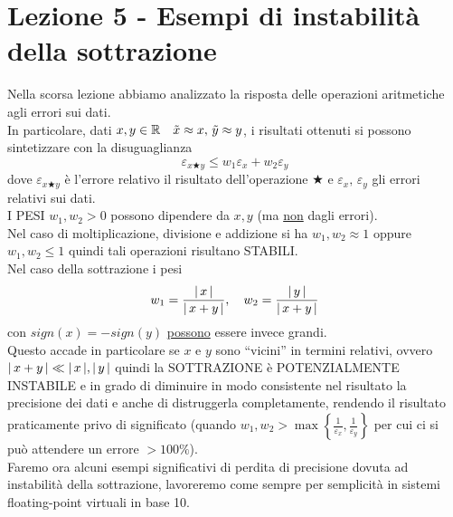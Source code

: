 \section{Lezione 5 - Esempi di instabilità della sottrazione}
Nella scorsa lezione abbiamo analizzato la risposta delle operazioni aritmetiche agli errori sui dati. \\
In particolare, dati $x, y \in \mathbb{R} \quad \Tilde{x} \approx x,\, \Tilde{y}\approx y$, i risultati ottenuti si possono sintetizzare con la disuguaglianza 
\[\varepsilon_{x \bigstar y} \le w_1\varepsilon_x + w_2\varepsilon_y\] 
dove $\varepsilon_{x \bigstar y}$ è l'errore relativo il risultato dell'operazione $\bigstar$ e $\varepsilon_x,\,\varepsilon_y$ gli errori relativi sui dati. \\
I PESI $w_1, w_2 > 0$ possono dipendere da $x,y$ (ma \uline{non} dagli errori).\\
Nel caso di moltiplicazione, divisione e addizione si ha $w_1, w_2 \approx 1$ oppure $w_1, w_2 \le 1$ quindi tali operazioni risultano STABILI.\\
Nel caso della sottrazione i pesi \[w_1 = \frac{\lvert\,x\,\rvert}{\lvert\,x + y\,\rvert}, \quad w_2 = \frac{\lvert\,y\,\rvert}{\lvert\,x + y\,\rvert}\] con $sign(x)=-sign(y)$ \uline{possono} essere invece grandi.\\
Questo accade in particolare se $x$ e $y$ sono “vicini” in termini relativi, ovvero $\lvert\,x+y\,\rvert \ll \lvert\,x\,\rvert,\lvert\,y\,\rvert$ quindi la SOTTRAZIONE è POTENZIALMENTE INSTABILE e in grado di diminuire in modo consistente nel risultato la precisione dei dati e anche di distruggerla completamente, rendendo il risultato praticamente privo di significato (quando $w_1,w_2 > \max \left \{ \frac{1}{\varepsilon_x},\frac{1}{\varepsilon_y} \right \}$ per cui ci si può attendere un errore $> 100\%$).\\
Faremo ora alcuni esempi significativi di perdita di precisione dovuta ad instabilità della sottrazione, lavoreremo come sempre per semplicità in sistemi floating-point virtuali in base 10.

